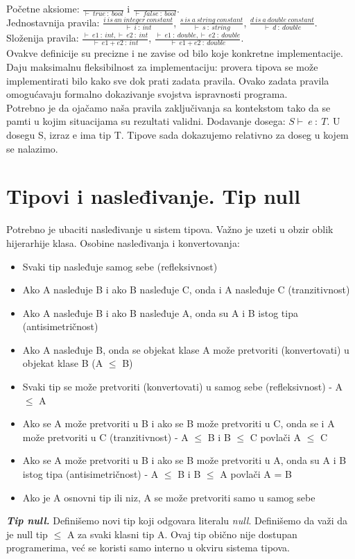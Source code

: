 \documentclass[10pt]{extarticle}
\begin{document}
Početne aksiome: $\frac{}{\vdash\ true\ :\ bool}$ i $\frac{}{\vdash\ false\ :\ bool}$. \\ Jednostavnija pravila: $\frac{i\ is\ an\ integer\ constant}{\vdash\ i\ :\ int}$, 
$\frac{s\ is\ a\ string\ constant}{\vdash\ s\ :\ string}$, 
$\frac{d\ is\ a\ double\ constant}{\vdash\ d\ :\ double}$. \\
Složenija pravila: $\frac{\vdash\ e1\ :\ int, \vdash\ e2\ :\ int}{\vdash\ e1+e2\ :\ int}$,
$\frac{\vdash\ e1\ :\ double, \vdash\ e2\ :\ double}{\vdash\ e1+e2\ :\ double}$. \\
Ovakve definicije su precizne i ne zavise od bilo koje konkretne implementacije. Daju maksimalnu fleksibilnost za implementaciju: provera tipova se može implementirati bilo kako sve dok prati zadata pravila. Ovako zadata pravila omogućavaju formalno dokazivanje svojstva ispravnosti programa. \\
Potrebno je da ojačamo naša pravila zaključivanja sa kontekstom tako da se pamti u kojim situacijama su rezultati validni. Dodavanje dosega: $S \vdash\ e\ :\ T$. U dosegu S, izraz e ima tip T. Tipove sada dokazujemo relativno za doseg u kojem se nalazimo.

\section{Tipovi i nasleđivanje. Tip null}
\noindent
Potrebno je ubaciti nasleđivanje u sistem tipova. Važno je uzeti u obzir oblik hijerarhije klasa. Osobine nasleđivanja i konvertovanja:
\begin{itemize}
    \item Svaki tip nasleđuje samog sebe (refleksivnost)
    \item Ako A nasleđuje B i ako B nasleđuje C, onda i A nasleđuje C (tranzitivnost) \item Ako A nasleđuje B i ako B nasleđuje A, onda su A i B istog tipa (antisimetričnost) 
    \item Ako A nasleđuje B, onda se objekat klase A može pretvoriti (konvertovati) u objekat klase B (A $\leq$ B)
    \item Svaki tip se može pretvoriti (konvertovati) u samog sebe (refleksivnost) - A $\leq$ A
    \item Ako se A može pretvoriti u B i ako se B može pretvoriti u C, onda se i A može pretvoriti u C (tranzitivnost) - A $\leq$ B i B $\leq$ C povlači A $\leq$ C
    \item Ako se A može pretvoriti u B i ako se B može pretvoriti u A, onda su A i B istog tipa (antisimetričnost) - A $\leq$ B i B $\leq$ A povlači A = B
    \item Ako je A osnovni tip ili niz, A se može pretvoriti samo u samog sebe
\end{itemize}
\textit{\textbf{Tip null.}} Definišemo novi tip koji odgovara literalu \textit{null}. Definišemo da važi da je null tip $\leq$ A za svaki klasni tip A. Ovaj tip obično nije dostupan programerima, već se koristi samo interno u okviru sistema tipova. 
\end{document}
